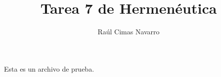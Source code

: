 \documentclass{article}
\title{Tarea 7 de Hermenéutica}
\author{Raúl Cimas Navarro}
\begin{document}
\maketitle

Esta es un archivo de prueba.
\end{document}
